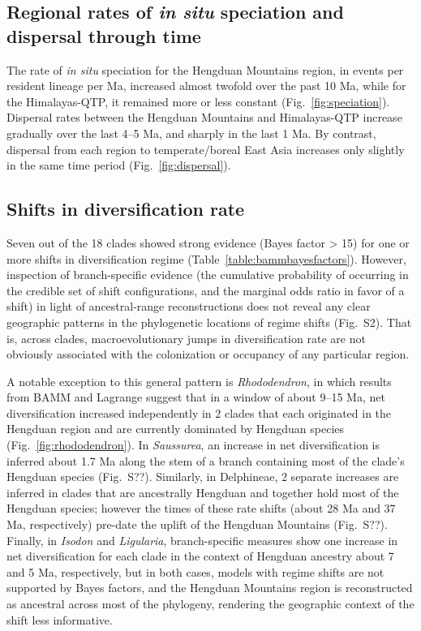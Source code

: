 \subsection{Regional rates of \textit{in situ} speciation and dispersal through time}

The rate of \textit{in situ} speciation for the Hengduan Mountains region, in events per resident lineage per Ma, increased almost twofold over the past 10 Ma, while for the Himalayas-QTP, it remained more or less constant (Fig.~\ref{fig:speciation}). Dispersal rates between the Hengduan Mountains and Himalayas-QTP increase gradually over the last 4--5 Ma, and sharply in the last 1 Ma. By contrast, dispersal from each region to temperate/boreal East Asia increases only slightly in the same time period (Fig.~\ref{fig:dispersal}).

\subsection{Shifts in diversification rate}

Seven out of the 18 clades showed strong evidence (Bayes factor > 15) for one or more shifts in diversification regime (Table~\ref{table:bammbayesfactors}). However, inspection of branch-specific evidence (the cumulative probability of occurring in the credible set of shift configurations, and the marginal odds ratio in favor of a shift) in light of ancestral-range reconstructions does not reveal any clear geographic patterns in the phylogenetic locations of regime shifts (Fig.~S2). That is, across clades, macroevolutionary jumps in diversification rate are not obviously associated with the colonization or occupancy of any particular region.

A notable exception to this general pattern is \emph{Rhododendron}, in which results from BAMM and Lagrange suggest that in a window of about 9--15 Ma, net diversification increased independently in 2 clades that each originated in the Hengduan region and are currently dominated by Hengduan species (Fig.~\ref{fig:rhododendron}). In \emph{Saussurea}, an increase in net diversification is inferred about 1.7 Ma along the stem of a branch containing most of the clade's Hengduan species (Fig.~S??). Similarly, in Delphineae, 2 separate increases are inferred in clades that are ancestrally Hengduan and together hold most of the Hengduan species; however the times of these rate shifts (about 28 Ma and 37 Ma, respectively) pre-date the uplift of the Hengduan Mountains (Fig.~S??). Finally, in \emph{Isodon} and \emph{Ligularia}, branch-specific measures show one increase in net diversification for each clade in the context of Hengduan ancestry about 7 and 5 Ma, respectively, but in both cases, models with regime shifts are not supported by Bayes factors, and the Hengduan Mountains region is reconstructed as ancestral across most of the phylogeny, rendering the geographic context of the shift less informative.

